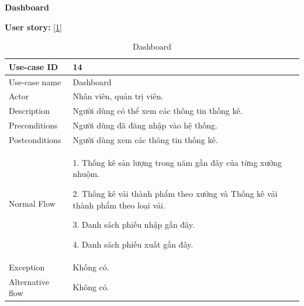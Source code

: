 \textbf{Dashboard}\par
\textbf{User story:} [\ref{bang14}]
\begin{table}[!htp]
    \centering
    \begin{tabular}{|m{3cm}|m{10cm}|}
    \hline 
        Use-case ID & 14\\ \hline
        Use-case name & Dashboard\\ \hline
        Actor & Nhân viên, quản trị viên.\\ \hline
        Description & Người dùng có thể xem các thông tin thống kê.\\ \hline
        Preconditions & Người dùng đã đăng nhập vào hệ thống.\\ \hline
        Postconditions & Người dùng xem các thông tin thống kê.\\ \hline
        Normal Flow & 
        1. Thống kê sản lượng trong năm gần đây của từng xưởng nhuộm.\par
        2. Thống kê vải thành phẩm theo xưởng và Thống kê vải thành phẩm theo loại vải.\par
        3. Danh sách phiếu nhập gần đây.\par
        4. Danh sách phiếu xuất gần đây.
        \\ \hline
        Exception & Khống có.\\ \hline
        Alternative flow & Không có.\\ 
    \hline 
    \end{tabular}
    \caption{Dashboard}
    \label{bang14}
\end{table}

